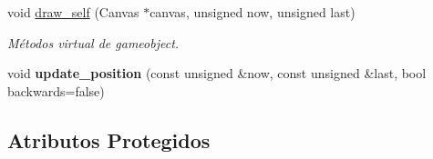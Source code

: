 \begin{DoxyCompactItemize}
\mbox{\label{classCharacter_a80d2f8164974c6a5b8a3c144508ec4a1}} 
void \mbox{\hyperlink{classCharacter_a80d2f8164974c6a5b8a3c144508ec4a1}{draw\+\_\+self}} (Canvas $\ast$canvas, unsigned now, unsigned last)
\begin{DoxyCompactList}\small\item\em Métodos virtual de gameobject. \end{DoxyCompactList}\item 
\mbox{\label{classCharacter_a990779ce4c7baf305b9f04ba831a1f0f}} 
void {\bfseries update\+\_\+position} (const unsigned \&now, const unsigned \&last, bool backwards=false)
\end{DoxyCompactItemize}
\subsection*{Atributos Protegidos}
